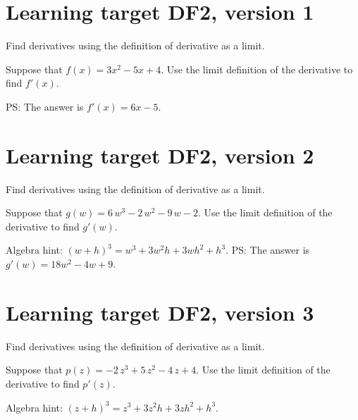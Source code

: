 
\usepackage{pgfplots}



\section{Learning target DF2, version 1}

Find derivatives using the definition of derivative as a limit.

\hrulefill

Suppose that $f(x) = 3x^2 - 5x + 4$. Use the limit definition of the derivative to find $f'(x)$. 

\vfill

PS: The answer is $f'(x) = 6x - 5$.
\pagebreak

\section{Learning target DF2, version 2}

Find derivatives using the definition of derivative as a limit.

\hrulefill

Suppose that  \(g(w) = 6 \, w^{3} - 2 \, w^{2} - 9 \, w - 2\). Use the limit definition of the derivative to find $g'(w)$.

\vspace{1em} 

Algebra hint: $(w+h)^3 = w^3 + 3w^2 h + 3w h^2 + h^3$.
\vfill
PS: The answer is $g'(w) = 18w^2 - 4w + 9.$


\pagebreak

\section{Learning target DF2, version 3}

Find derivatives using the definition of derivative as a limit.

\hrulefill

Suppose that  \(p(z) = -2 \, z^{3} +5 \, z^{2} - 4 \, z +4\). Use the limit definition of the derivative to find $p'(z)$.

\vspace{1em} 

Algebra hint: $(z+h)^3 = z^3 + 3z^2 h + 3z h^2 + h^3$.

